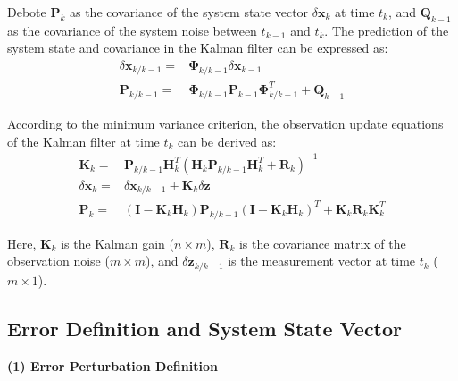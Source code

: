 \documentclass{article}
\begin{document}
Debote $\boldsymbol{P}_{k}$ as the covariance of the system state vector $\delta \boldsymbol{x}_{k}$ at time $t_{k}$, and $\boldsymbol{Q}_{k-1}$ as the covariance of the system noise between $t_{k-1}$ and $t_{k}$. The prediction of the system state and covariance in the Kalman filter can be expressed as:
\begin{equation}
    \begin{aligned}
        \delta \boldsymbol{x}_{k/k-1} =& \boldsymbol{\Phi}_{k/k-1} \delta \boldsymbol{x}_{k-1} \\
        \boldsymbol{P}_{k/k-1} =& \boldsymbol{\Phi}_{k/k-1} \boldsymbol{P}_{k-1} \boldsymbol{\Phi}_{k/k-1}^{T} + \boldsymbol{Q}_{k-1}
    \end{aligned}
    \label{eq:kalman-prediction-equation}
\end{equation}

According to the minimum variance criterion, the observation update equations of the Kalman filter at time $t_{k}$ can be derived as:
\begin{equation}
    \begin{aligned}
        \boldsymbol{K}_k =& \boldsymbol{P}_{k/k-1} \boldsymbol{H}_k^T \left( \boldsymbol{H}_k \boldsymbol{P}_{k/k-1} \boldsymbol{H}_k^T + \boldsymbol{R}_k \right)^{-1} \\
        \delta \boldsymbol{x}_k =& \delta \boldsymbol{x}_{k/k-1} + \boldsymbol{K}_k \delta \boldsymbol{z}\\
        \boldsymbol{P}_k =& (\boldsymbol{I} - \boldsymbol{K}_k \boldsymbol{H}_k)\boldsymbol{P}_{k/k-1} (\boldsymbol{I} - \boldsymbol{K}_k \boldsymbol{H}_k)^T + \boldsymbol{K}_k \boldsymbol{R}_k \boldsymbol{K}_k^T 
    \end{aligned}
    \label{eq:kalman-update-equation}
\end{equation}

Here, $\boldsymbol{K}_{k}$ is the Kalman gain ($n \times m$), $\boldsymbol{R}_{k}$ is the covariance matrix of the observation noise ($m \times m$), and $\delta \boldsymbol{z}_{k/k-1}$ is the measurement vector at time $t_{k}$ ($m \times 1$).

\subsection{Error Definition and System State Vector} \label{subsec:error-definition-and-system-state-vector}

\textbf{(1) Error Perturbation Definition}
\end{document}
